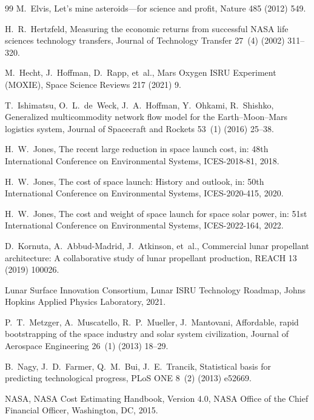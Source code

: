 \documentclass[preprint,12pt]{elsarticle}
\begin{document}
\begin{thebibliography}{99}
M.~Elvis,
\newblock Let's mine asteroids---for science and profit,
\newblock Nature 485 (2012) 549.

H.~R.~Hertzfeld,
\newblock Measuring the economic returns from successful NASA life sciences technology transfers,
\newblock Journal of Technology Transfer 27~(4) (2002) 311--320.

M.~Hecht, J.~Hoffman, D.~Rapp, et~al.,
\newblock Mars Oxygen ISRU Experiment (MOXIE),
\newblock Space Science Reviews 217 (2021) 9.

T.~Ishimatsu, O.~L.~de~Weck, J.~A.~Hoffman, Y.~Ohkami, R.~Shishko,
\newblock Generalized multicommodity network flow model for the Earth--Moon--Mars logistics system,
\newblock Journal of Spacecraft and Rockets 53~(1) (2016) 25--38.

H.~W.~Jones,
\newblock The recent large reduction in space launch cost,
\newblock in: 48th International Conference on Environmental Systems, ICES-2018-81, 2018.

H.~W.~Jones,
\newblock The cost of space launch: History and outlook,
\newblock in: 50th International Conference on Environmental Systems, ICES-2020-415, 2020.

H.~W.~Jones,
\newblock The cost and weight of space launch for space solar power,
\newblock in: 51st International Conference on Environmental Systems, ICES-2022-164, 2022.

D.~Kornuta, A.~Abbud-Madrid, J.~Atkinson, et~al.,
\newblock Commercial lunar propellant architecture: A collaborative study of lunar propellant production,
\newblock REACH 13 (2019) 100026.

Lunar Surface Innovation Consortium,
\newblock Lunar ISRU Technology Roadmap,
\newblock Johns Hopkins Applied Physics Laboratory, 2021.

P.~T.~Metzger, A.~Muscatello, R.~P.~Mueller, J.~Mantovani,
\newblock Affordable, rapid bootstrapping of the space industry and solar system civilization,
\newblock Journal of Aerospace Engineering 26~(1) (2013) 18--29.

B.~Nagy, J.~D.~Farmer, Q.~M.~Bui, J.~E.~Trancik,
\newblock Statistical basis for predicting technological progress,
\newblock PLoS ONE 8~(2) (2013) e52669.

NASA,
\newblock NASA Cost Estimating Handbook, Version 4.0,
\newblock NASA Office of the Chief Financial Officer, Washington, DC, 2015.


\end{thebibliography}
\end{document}
